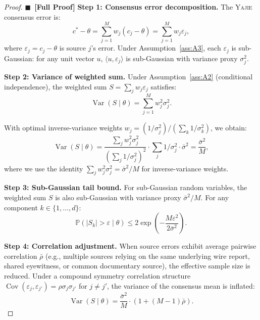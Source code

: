 \documentclass[11pt,a4paper]{article}
\theoremstyle{definition}
\newcommand{\rigorFull}[0]{$\blacksquare$~\textbf{[Full Proof]}}
\newcommand{\Yajie}{\textsc{Yajie}}
\DeclareMathOperator{\Var}{Var}
\DeclareMathOperator{\Cov}{Cov}
\newcommand{\Pbb}{\mathbb{P}}
\newcommand{\abs}[1]{\left|#1\right|}
\newcommand{\inner}[2]{\langle #1, #2 \rangle}
\begin{document}
\begin{proof}\rigorFull
\textbf{Step 1: Consensus error decomposition.} The \Yajie{} consensus error is:
\begin{equation}
    c^* - \theta = \sum_{j=1}^{M} w_j (c_j - \theta) = \sum_{j=1}^{M} w_j \varepsilon_j,
    \label{eq:error_decomp}
\end{equation}
where $\varepsilon_j = c_j - \theta$ is source $j$'s error. Under Assumption~\ref{ass:A3}, each $\varepsilon_j$ is sub-Gaussian: for any unit vector $u$, $\inner{u}{\varepsilon_j}$ is sub-Gaussian with variance proxy $\sigma_j^2$.

\textbf{Step 2: Variance of weighted sum.} Under Assumption~\ref{ass:A2} (conditional independence), the weighted sum $S = \sum_j w_j \varepsilon_j$ satisfies:
\begin{equation}
    \Var(S \mid \theta) = \sum_{j=1}^{M} w_j^2 \sigma_j^2.
    \label{eq:var_weighted}
\end{equation}

With optimal inverse-variance weights $w_j = (1/\sigma_j^2) / (\sum_{k} 1/\sigma_k^2)$, we obtain:
\begin{equation}
    \Var(S \mid \theta) = \frac{\sum_j w_j^2 \sigma_j^2}{(\sum_j 1/\sigma_j^2)^2} \cdot \sum_j 1/\sigma_j^2 \cdot \bar{\sigma}^2 = \frac{\bar{\sigma}^2}{M},
    \label{eq:var_optimal}
\end{equation}
where we use the identity $\sum_j w_j^2 \sigma_j^2 = \bar{\sigma}^2 / M$ for inverse-variance weights.

\textbf{Step 3: Sub-Gaussian tail bound.} For sub-Gaussian random variables, the weighted sum $S$ is also sub-Gaussian with variance proxy $\bar{\sigma}^2 / M$. For any component $k \in \{1, \ldots, d\}$:
\begin{equation}
    \Pbb\left(\abs{S_k} > \varepsilon \mid \theta\right) \leq 2\exp\left(-\frac{M\varepsilon^2}{2\bar{\sigma}^2}\right).
    \label{eq:component_tail}
\end{equation}

\textbf{Step 4: Correlation adjustment.} When source errors exhibit average pairwise correlation $\bar{\rho}$ (e.g., multiple sources relying on the same underlying wire report, shared eyewitness, or common documentary source), the effective sample size is reduced. Under a compound symmetry correlation structure $\Cov(\varepsilon_j, \varepsilon_{j'}) = \rho \sigma_j \sigma_{j'}$ for $j \neq j'$, the variance of the consensus mean is inflated:
\begin{equation}
    \Var(S \mid \theta) = \frac{\bar{\sigma}^2}{M} \cdot (1 + (M-1)\bar{\rho}).
    \label{eq:correlated_variance}
\end{equation}


\end{proof}
\end{document}
